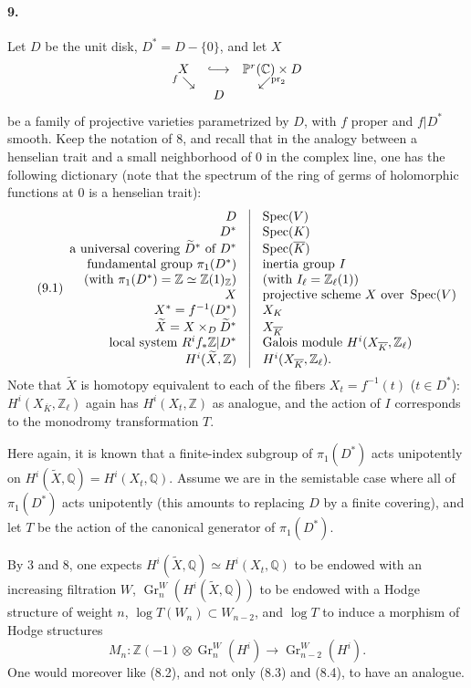 \documentclass[10pt]{article}
\newcommand{\C}{\mathbb C}
\newcommand{\Q}{\mathbb Q}
\newcommand{\Z}{\mathbb Z}
\newcommand{\Zl}{\mathbb Z_\ell}
\newcommand{\Gr}{\operatorname{Gr}}
\newcommand{\Spec}{\operatorname{Spec}}
\newcommand{\pr}{\operatorname{pr}}
\newcommand{\barK}{\overline{K}}
\newcommand{\wt}{\widetilde}
\begin{document}
\paragraph{9.} Let $D$ be the unit disk, $D^*=D-\{0\}$, and let $X$
\[
\begin{array}{ccc}
X&\lhook\joinrel\longrightarrow&\mathbb P^r(\C)\times D\\[-0.2em]
{}^{f}\searrow&&\swarrow^{\pr_2}\\[-0.2em]
& D&
\end{array}
\]
be a family of projective varieties parametrized by $D$, with $f$ proper and $f|D^*$ smooth. Keep the notation of 8, and recall that in the analogy between a henselian trait and a small neighborhood of $0$ in the complex line, one has the following dictionary (note that the spectrum of the ring of germs of holomorphic functions at $0$ is a henselian trait):
\[
\tag{9.1}
\begin{array}{r@{\quad\vrule\quad}l}
D & \Spec(V)\\
D^* & \Spec(K)\\
\text{a universal covering }\wt D^*\text{ of }D^* & \Spec(\barK)\\
\text{fundamental group }\pi_1(D^*) & \text{inertia group }I\\
\text{(with }\pi_1(D^*)=\Z\simeq\Z(1)_\Z\text{)} & \text{(with }I_\ell=\Zl(1)\text{)}\\
X & \text{projective scheme }X\text{ over }\Spec(V)\\
X^*=f^{-1}(D^*) & X_K\\
\wt X=X\times_D\wt D^* & X_{\barK}\\
\text{local system }R^if_*\Z|D^* & \text{Galois module }H^i(X_{\barK},\Zl)\\
H^i(\wt X,\Z) & H^i(X_{\barK},\Zl).
\end{array}
\]
Note that $\wt X$ is homotopy equivalent to each of the fibers $X_t=f^{-1}(t)$ ($t\in D^*$): $H^i(X_{\barK},\Zl)$ again has $H^i(X_t,\Z)$ as analogue, and the action of $I$ corresponds to the monodromy transformation $T$.

Here again, it is known that a finite-index subgroup of $\pi_1(D^*)$ acts unipotently on $H^i(\wt X,\Q)=H^i(X_t,\Q)$. Assume we are in the semistable case where all of $\pi_1(D^*)$ acts unipotently (this amounts to replacing $D$ by a finite covering), and let $T$ be the action of the canonical generator of $\pi_1(D^*)$.

By 3 and 8, one expects $H^i(\wt X,\Q)\simeq H^i(X_t,\Q)$ to be endowed with an increasing filtration $W$, $\Gr_n^W(H^i(\wt X,\Q))$ to be endowed with a Hodge structure of weight $n$, $\log T(W_n)\subset W_{n-2}$, and $\log T$ to induce a morphism of Hodge structures
\[
M_n:\Z(-1)\otimes\Gr_n^W(H^i)\longrightarrow\Gr_{n-2}^W(H^i).
\]
One would moreover like (8.2), and not only (8.3) and (8.4), to have an analogue.
\end{document}
